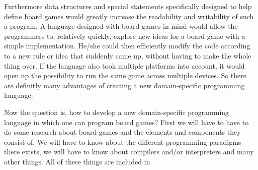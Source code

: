 Furthermore data structures and special statements specifically designed to help define board games would greatly increase the readability and writability of such a program. A language designed with board games in mind would allow the programmers to, relatively quickly, explore new ideas for a board game with a simple implementation. He/she could then efficiently modify the code according to a new rule or idea that suddenly came up, without having to make the whole thing over. If the language also took multiple platforms into account, it would open up the possibility to run the same game across multiple devices. So there are definitly many advantages of creating a new domain-specific programming language. 

Now the question is, how to develop a new domain-specific programming language in which one can program board games? First we will have to have to do some research about board games and the elements and components they consist of. We will have to know about the different programming paradigms there exists, we will have to know about compilers and/or interpreters and many other things. All of these things are included in 

%
%
